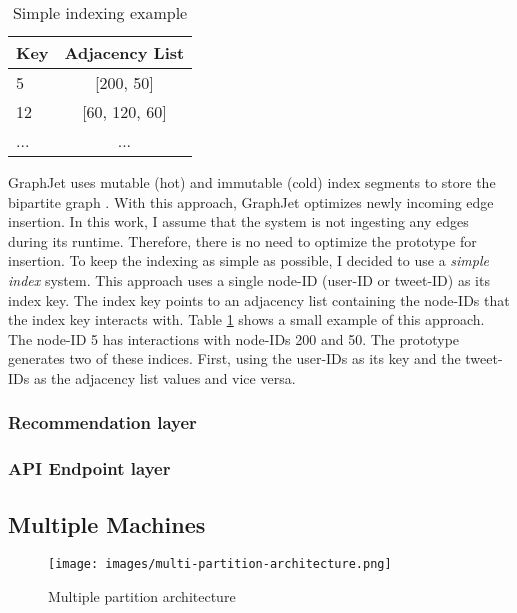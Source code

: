 \begin{table}[!h]
	\centering
	\caption{Simple indexing example}
	\label{tab:simple-indexing}
	\begin{tabular}{|l|c|}
		\hline
		\textbf{Key} & \textbf{Adjacency List} \\
		\hline
		5 & [200, 50] \\
		\hline
		12 & [60, 120, 60] \\
		\hline
		... & ... \\
		\hline
	\end{tabular}
\end{table}


GraphJet uses mutable (hot) and immutable (cold) index segments to store the bipartite graph \cite{sharmaGraphJetRealtimeContent2016}. With this approach, GraphJet optimizes newly incoming edge insertion. In this work, I assume that the system is not ingesting any edges during its runtime. Therefore, there is no need to optimize the prototype for insertion. To keep the indexing as simple as possible, I decided to use a \emph{simple index} system. This approach uses a single node-ID (user-ID or tweet-ID) as its index key. The index key points to an adjacency list containing the node-IDs that the index key interacts with. Table \ref{tab:simple-indexing} shows a small example of this approach. The node-ID 5 has interactions with node-IDs 200 and 50. The prototype generates two of these indices. First, using the user-IDs as its key and the tweet-IDs as the adjacency list values and vice versa.


\subsubsection{Recommendation layer}
\label{subsubsec:recommendation-layer}


\subsubsection{API Endpoint layer}
\label{subsubsec:api-endpoint-layer}


\subsection{Multiple Machines}
\label{Multiple Machines}

\begin{figure}[!h]
	\centering
	\texttt{[image: images/multi-partition-architecture.png]}
	\caption{Multiple partition architecture}
	\label{fig:multiple-machine-architecture}
\end{figure}

